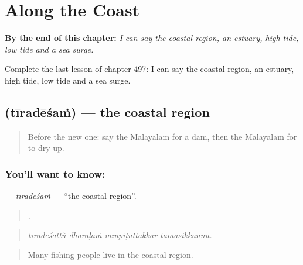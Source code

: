 
\chapter{Along the Coast}
\label{ch:ml-along-the-coast}

\begin{chapteropening}
\textbf{By the end of this chapter:} \emph{I can say the coastal region, an estuary, high tide, low tide and a sea surge.}

Complete the last lesson of chapter 497: I can say the coastal region, an estuary, high tide, low tide and a sea surge.
\end{chapteropening}

\section[\texorpdfstring{\ml{തീരദേശം} (tīradēśaṁ)}{തീരദേശം (tīradēśaṁ)}]{ (tīradēśaṁ) — the coastal region}

\label{lesson:ML-C497-tiradesam}



\begin{quote}
Before the new one: say the Malayalam for a dam, then the Malayalam for to dry up.
\end{quote}

\subsection*{You'll want to know: }
\textbf{} — \emph{tīradēśaṁ} — \textquotedblleft{}the coastal region\textquotedblright{}.

\begin{quote}
   .
\end{quote}

\begin{quote}
\emph{tīradēśattŭ dhārāḷaṁ mīnpiṭuttakkār tāmasikkunnu.}
\end{quote}

\begin{quote}
Many fishing people live in the coastal region.
\end{quote}

